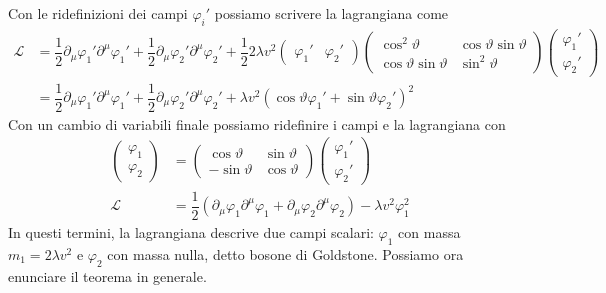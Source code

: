 \documentclass[italian,a4paper]{article}
\theoremstyle{definition}
\newcommand{\lagr}{\ensuremath{\mathscr{L}}}
\renewcommand{\theta}{\vartheta}
\begin{document}
Con le ridefinizioni dei campi $\varphi_i'$ possiamo scrivere la lagrangiana
come
\begin{align*}
    \lagr &= 
    \dfrac{1}{2}\partial_\mu \varphi_1'\partial^\mu \varphi_1' +
    \dfrac{1}{2}\partial_\mu \varphi_2'\partial^\mu \varphi_2' +
    \dfrac{1}{2}2\lambda v^2
    \begin{pmatrix}
        \varphi_1' & \varphi_2'
    \end{pmatrix}
    \begin{pmatrix}
        \cos^2 \theta & \cos\theta \sin\theta\\
        \cos\theta \sin\theta & \sin^2 \theta
    \end{pmatrix}
    \begin{pmatrix}
        \varphi_1'\\
        \varphi_2'
    \end{pmatrix}\\
    &= 
    \dfrac{1}{2}\partial_\mu \varphi_1'\partial^\mu \varphi_1' +
    \dfrac{1}{2}\partial_\mu \varphi_2'\partial^\mu \varphi_2' +
    \lambda v^2(\cos\theta \varphi_1' + \sin\theta \varphi_2')^2
\end{align*}
Con un cambio di variabili finale possiamo ridefinire i campi e la
lagrangiana con
\begin{align*}
    \begin{pmatrix}
        \varphi_1\\
        \varphi_2
    \end{pmatrix} &= 
    \begin{pmatrix}
        \cos \theta & \sin \theta \\
        -\sin \theta & \cos \theta
    \end{pmatrix}
     \begin{pmatrix}
        \varphi_1'\\
        \varphi_2'
    \end{pmatrix}\\
\lagr &=
    \dfrac{1}{2}(\partial_\mu \varphi_1\partial^\mu \varphi_1 +
    \partial_\mu \varphi_2\partial^\mu \varphi_2) -
    \lambda v^2 \varphi_1^2
\end{align*}
In questi termini, la lagrangiana descrive due campi scalari: $\varphi_1$ con massa
$m_1 = 2\lambda v^2$ e $\varphi_2$ con massa nulla, detto bosone di
Goldstone. Possiamo ora enunciare il teorema in generale.
\end{document}
